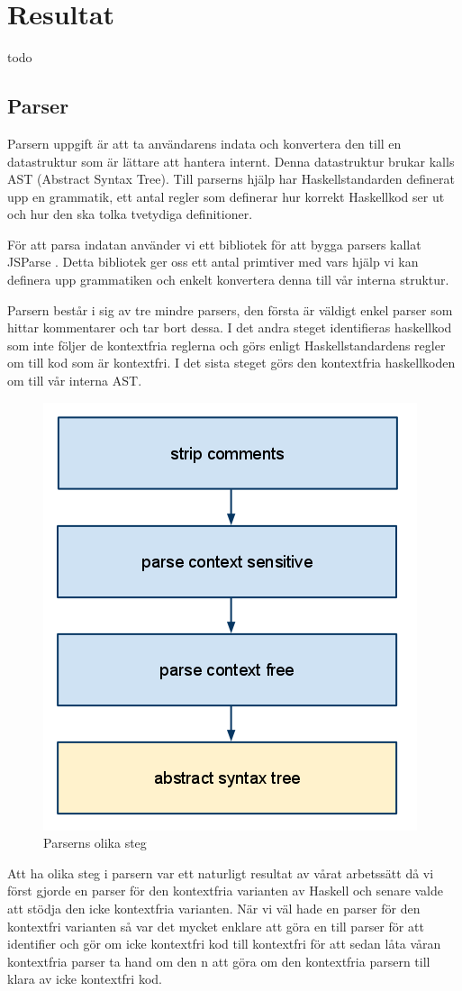 \section{Resultat}
todo

\subsection{Parser} 
Parsern uppgift är att ta användarens indata och konvertera den till en datastruktur 
som är lättare att hantera internt. Denna datastruktur brukar kalls AST (Abstract Syntax Tree). 
Till parserns hjälp har Haskellstandarden definerat upp en grammatik, 
ett antal regler som definerar hur korrekt Haskellkod ser ut och hur den ska tolka tvetydiga definitioner.

För att parsa indatan använder vi ett bibliotek för att bygga parsers kallat JSParse \citep{jsparse}. 
Detta bibliotek ger oss ett antal primtiver med vars hjälp vi kan definera upp grammatiken 
och enkelt konvertera denna till vår interna struktur.

Parsern består i sig av tre mindre parsers, den första är väldigt enkel parser som hittar kommentarer och tar bort dessa. 
I det andra steget identifieras haskellkod som inte följer de kontextfria reglerna och görs enligt Haskellstandardens regler om till kod som är kontextfri. 
I det sista steget görs den kontextfria haskellkoden om till vår interna AST.

\begin{figure}[H]
    \begin{center}
        \includegraphics[width=.4\textwidth]{parser_1.png}
        \caption{Parserns olika steg}
    \end{center}
\end{figure}

Att ha olika steg i parsern var ett naturligt resultat av vårat arbetssätt då vi först gjorde en parser för den kontextfria varianten av Haskell och 
senare valde att stödja den icke kontextfria varianten. När vi väl hade en parser för den kontextfri varianten så var det mycket 
enklare att göra en till parser för att identifier och gör om icke kontextfri kod till kontextfri för att sedan låta våran kontextfria parser ta hand om den 
n att göra om den kontextfria parsern till klara av icke kontextfri kod.

